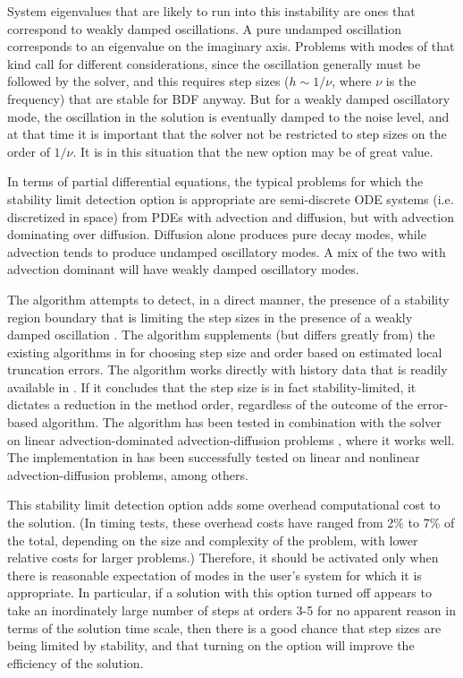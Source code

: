 System eigenvalues that are likely to run into this instability are
ones that correspond to weakly damped oscillations.  A pure undamped
oscillation corresponds to an eigenvalue on the imaginary axis.
Problems with modes of that kind call for different considerations,
since the oscillation generally must be followed by the solver, and
this requires step sizes ($h \sim 1/\nu$, where $\nu$ is the frequency) 
that are stable for BDF anyway.  But for a weakly damped oscillatory mode,
the oscillation in the solution is eventually damped to the noise level, 
and at that time it is important that the solver not be restricted to step 
sizes on the order of $1/\nu$.  It is in this situation that the new option may
be of great value.

In terms of partial differential equations, the typical problems for
which the stability limit detection option is appropriate are
semi-discrete ODE systems (i.e. discretized in space) from PDEs with
advection and diffusion, but with advection dominating over diffusion.
Diffusion alone produces pure decay modes, while advection tends to
produce undamped oscillatory modes.  A mix of the two with advection
dominant will have weakly damped oscillatory modes.

The {\stald} algorithm attempts to detect, in a direct
manner, the presence of a stability region boundary that is limiting
the step sizes in the presence of a weakly damped oscillation \cite{Hi92}.
The algorithm supplements (but differs greatly from) the existing
algorithms in {\cvodes} for choosing step size and order based on
estimated local truncation errors.  The {\stald} algorithm works directly
with history data that is readily available in {\cvodes}.  If it concludes
that the step size is in fact stability-limited, it dictates a
reduction in the method order, regardless of the outcome of the
error-based algorithm.  The {\stald} algorithm has been tested in
combination with the {\vode} solver on linear advection-dominated
advection-diffusion problems \cite{Hi95}, where it works well.  The
implementation in {\cvodes} has been successfully tested on linear 
and nonlinear advection-diffusion problems, among others.

This stability limit detection option adds some overhead computational
cost to the {\cvodes} solution.  (In timing tests, these overhead costs
have ranged from 2\% to 7\% of the total, depending on the size and
complexity of the problem, with lower relative costs for larger
problems.)  Therefore, it should be activated only when there is
reasonable expectation of modes in the user's system for which it is
appropriate.  In particular, if a {\cvodes} solution with this option
turned off appears to take an inordinately large number of steps at
orders 3-5 for no apparent reason in terms of the solution time scale,
then there is a good chance that step sizes are being limited by
stability, and that turning on the option will improve the efficiency
of the solution. 

